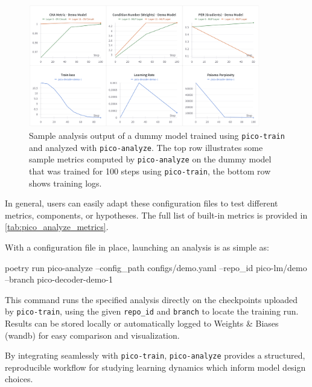 \begin{figure}[t]
    \centering
    \includegraphics[width=0.9\textwidth]{chapters/pico/figures/demo_full_run.png}
    \caption{Sample analysis output of a dummy model trained using \texttt{pico-train} and analyzed with \texttt{pico-analyze}. The top row illustrates some sample metrics computed by \texttt{pico-analyze} on the dummy model that was trained for 100 steps using \texttt{pico-train}, the bottom row shows training logs.}
    \label{fig:demo_full_run}
\end{figure}

In general, users can easily adapt these configuration files to test different metrics, components, or hypotheses. The full list of built-in metrics is provided in \cref{tab:pico_analyze_metrics}.

With a configuration file in place, launching an analysis is as simple as:

\begin{center}
    \begin{codelisting}
    poetry run pico-analyze
        --config_path configs/demo.yaml
        --repo_id pico-lm/demo
        --branch pico-decoder-demo-1
    \end{codelisting}
\end{center}

This command runs the specified analysis directly on the checkpoints uploaded by \texttt{pico-train}, using the given \verb|repo_id| and \verb|branch| to locate the training run. Results can be stored locally or automatically logged to Weights \& Biases (wandb) \citep{wandb} for easy comparison and visualization.

By integrating seamlessly with \texttt{pico-train}, \texttt{pico-analyze} provides a structured, reproducible workflow for studying learning dynamics which inform model design choices.

